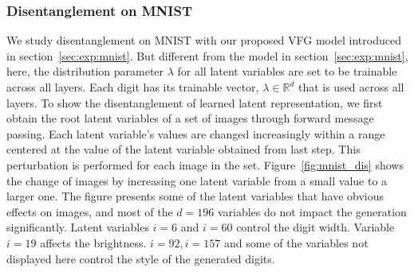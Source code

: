\documentclass{article}
\begin{document}
\subsubsection{Disentanglement on MNIST}
We study disentanglement on MNIST with our proposed VFG model introduced in section~\ref{sec:exp:mnist}. But different from the model in section~\ref{sec:exp:mnist}, here, the distribution parameter $\lambda$ for all latent variables are set to be trainable across all layers.  
Each digit has its trainable vector,  $\lambda \in \mathbb{R}^d$ that is used across all layers. 
To show the disentanglement of learned latent representation, we first obtain the root latent variables of a set of images through forward message passing. Each latent variable's values are changed increasingly within a range centered at the value of the latent variable obtained from last step. 
This perturbation is performed for each image in the set.
Figure~\ref{fig:mnist_dis} shows the change of images by increasing one latent variable from a small value to a larger one. The figure presents some of the latent variables that have obvious effects on images, and most of the $d=196$ variables do not impact the generation significantly. Latent variables $i=6$ and $i=60$ control the digit width. Variable $i=19$ affects the brightness.  $i=92, i=157$ and some of the variables not displayed here control the style of the generated digits. 
\end{document}
